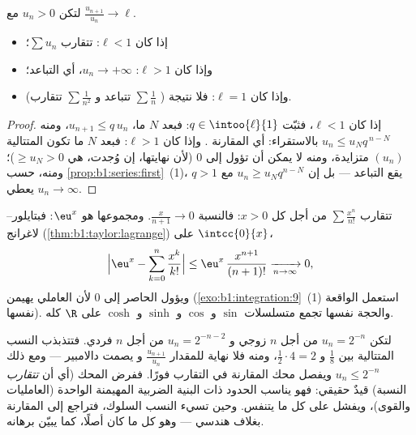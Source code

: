 \begin{theorem}\label{thm:b1:series:ratio}
لتكن $u_n > 0$ مع $\frac{u_{n+1}}{u_n} \to \ell$.
\begin{itemize}
  \item إذا كان $\ell < 1$: تتقارب $\sum u_n$؛
  \item وإذا كان $\ell > 1$: $u_n \to +\infty$، أي التباعد؛
  \item وإذا كان $\ell = 1$: فلا نتيجة ( $\sum \frac1n$ تتباعد و $\sum
        \frac{1}{n^2}$ تتقارب).
\end{itemize}
\end{theorem}

\begin{proof}
إذا كان $\ell < 1$، فثبّت $q \in \intoo{\ell}{1}$: فبعد $N$ ما،
$u_{n+1} \leq q\,u_n$، ومنه $u_n \leq u_N q^{\,n-N}$ بالاستقراء:
أي المقارنة . وإذا كان $\ell > 1$: فبعد $N$ ما
تكون المتتالية $(u_n)$ متزايدة، ومنه لا يمكن أن تؤول إلى $0$
(لأن نهايتها، إن وُجدت، هي $\geq u_N > 0$)؛ ومنه، حسب
\cref{prop:b1:series:first}~(1)، يقع التباعد --- بل إن $u_n
\geq u_N q^{n-N}$ مع $q > 1$ يعطي $u_n \to \infty$.
\end{proof}

\begin{example}\label{ex:b1:series:ratio}
تتقارب $\sum \frac{x^n}{n!}$ من أجل كل $x > 0$: فالنسبة
$\frac{x}{n+1} \to 0$. ومجموعها هو $\eu^x$: فبتايلور--لاغرانج
(\cref{thm:b1:taylor:lagrange}) على $\intcc{0}{x}$،
\[
\Bigl| \eu^x - \sum_{k=0}^{n} \frac{x^k}{k!} \Bigr|
\leq \eu^{x}\, \frac{x^{n+1}}{(n+1)!} \xrightarrow[n\to\infty]{} 0 ,
\]
ويؤول الحاصر إلى $0$ لأن العاملي يهيمن
(\cref{exo:b1:integration:9}~(1) استعمل الواقعة نفسها). والحجة نفسها
تجمع متسلسلات $\sin$ و $\cos$ و $\sinh$ و $\cosh$ على $\R$ كله.
\end{example}

\begin{example}\label{ex:b1:series:rationotnecessary}
لتكن $u_n = 2^{-n}$ من أجل $n$ زوجي و $u_n = 2^{-n-2}$ من أجل $n$
فردي. فتتذبذب النسب المتتالية بين $\frac{1}{8}$ و
$\frac12\cdot4 = 2$، ومنه فلا نهاية للمقدار $\frac{u_{n+1}}{u_n}$ و
يصمت دالامبير --- ومع ذلك $u_n \leq 2^{-n}$ ويفصل محك
المقارنة في التقارب فورًا. ففرض المحك (أي أن
\emph{تتقارب} النسبة) قيدٌ حقيقي: فهو يناسب الحدود
ذات البنية الضربية المهيمنة الواحدة (العامليات والقوى)،
ويفشل على كل ما يتنفس. وحين تسيء النسب السلوك،
فتراجع إلى المقارنة بغلاف هندسي --- وهو كل ما كان
 أصلًا، كما يبيّن برهانه.
\end{example}

